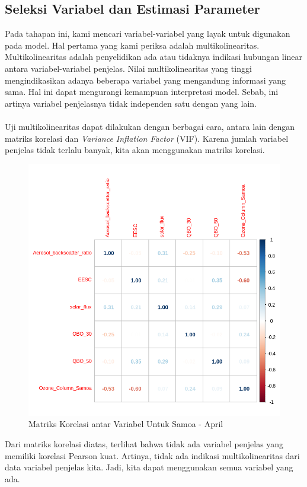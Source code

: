\begin{enumerate}
\subsection{Seleksi Variabel dan Estimasi Parameter}
Pada tahapan ini, kami mencari variabel-variabel yang layak untuk digunakan pada model. Hal pertama yang kami periksa adalah multikolinearitas. Multikolinearitas adalah penyelidikan ada atau tidaknya indikasi hubungan linear antara variabel-variabel penjelas. Nilai multikolinearitas yang tinggi mengindikasikan adanya beberapa variabel yang mengandung informasi yang sama. Hal ini dapat mengurangi kemampuan interpretasi model. Sebab, ini artinya variabel penjelasnya tidak independen satu dengan yang lain.
\\~\\
Uji multikolinearitas dapat dilakukan dengan berbagai cara, antara lain dengan matriks korelasi dan \textit{Variance Inflation Factor} (VIF). Karena jumlah variabel penjelas tidak terlalu banyak, kita akan menggunakan matriks korelasi.
\begin{figure}[h!]
    \centering
    \includegraphics[scale=0.5]{src/Pics/corrmatrix.png}
    \caption{Matriks Korelasi antar Variabel Untuk Samoa - April}
    \label{fig:my_label}
\end{figure}
Dari matriks korelasi diatas, terlihat bahwa tidak ada variabel penjelas yang memiliki korelasi Pearson kuat. Artinya, tidak ada indikasi multikolinearitas dari data variabel penjelas kita. Jadi, kita dapat menggunakan semua variabel yang ada.

\end{enumerate}
